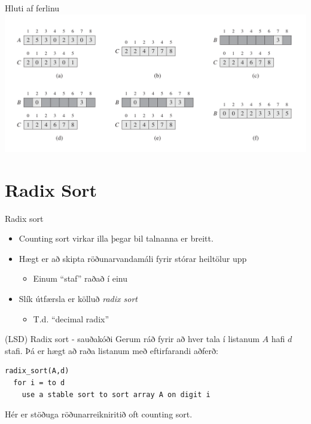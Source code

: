 \documentclass{beamer}
\begin{document}
\begin{frame}{Hluti af ferlinu}
\includegraphics[width=\textwidth]{Pics/CountingSort}
\end{frame}

\section{Radix Sort}

\begin{frame}{Radix sort}
\begin{itemize}
 \item Counting sort virkar illa þegar bil talnanna er breitt.
 \item Hægt er að skipta röðunarvandamáli fyrir stórar heiltölur upp
 \begin{itemize}
  \item Einum ``staf'' raðað í einu
 \end{itemize}
 \item Slík útfærsla er kölluð \emph{radix sort}
 \begin{itemize}
  \item T.d. ``decimal radix''
 \end{itemize}
\end{itemize}
\end{frame}

\begin{frame}[fragile]{(LSD) Radix sort - sauðakóði}
Gerum ráð fyrir að hver tala í listanum $A$ hafi $d$ stafi. Þá er hægt að raða listanum með eftirfarandi aðferð:
\begin{verbatim}
radix_sort(A,d)
  for i = to d
    use a stable sort to sort array A on digit i
\end{verbatim}
Hér er stöðuga röðunarreikniritið oft counting sort.
\end{frame}
\end{document}
